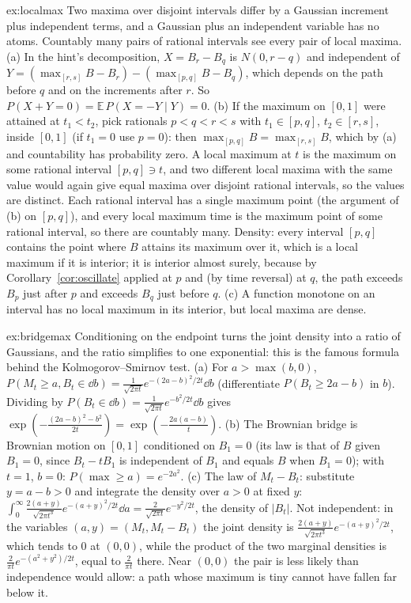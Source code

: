 \begin{solution}{ex:localmax}
\idea Two maxima over disjoint intervals differ by a Gaussian increment plus independent terms, and a Gaussian plus an independent variable has no atoms. Countably many pairs of rational intervals see every pair
of local maxima.
\writeup (a) In the hint's decomposition, $X=B_r-B_q$ is $N(0,r-q)$ and independent of $Y=(\max_{[r,s]}B-B_r)-(\max_{[p,q]}B-B_q)$, which depends on the path before $q$ and on the increments after $r$. So
$P(X+Y=0)=\mathbb E\,P(X=-Y\mid Y)=0$. (b) If the maximum on $[0,1]$ were attained at $t_1<t_2$, pick rationals $p<q<r<s$ with $t_1\in[p,q]$, $t_2\in[r,s]$, inside $[0,1]$ (if $t_1=0$ use $p=0$): then
$\max_{[p,q]}B=\max_{[r,s]}B$, which by (a) and countability has probability zero. A local maximum at $t$ is the maximum on some rational interval $[p,q]\ni t$, and two different local maxima with the same value would
again give equal maxima over disjoint rational intervals, so the values are distinct. Each rational interval has a single maximum point (the argument of (b) on $[p,q]$), and every local maximum time is the maximum
point of some rational interval, so there are countably many. Density: every interval $[p,q]$ contains the point where $B$ attains its maximum over it, which is a local maximum if it is interior; it is interior
almost surely, because by Corollary~\ref{cor:oscillate} applied at $p$ and (by time reversal) at $q$, the path exceeds $B_p$ just after $p$ and exceeds $B_q$ just before $q$. (c) A function monotone on an interval has no local
maximum in its interior, but local maxima are dense.
\end{solution}

\begin{solution}{ex:bridgemax}
\idea Conditioning on the endpoint turns the joint density into a ratio of Gaussians, and the ratio simplifies to one exponential: this is the famous formula behind the Kolmogorov--Smirnov test.
\writeup (a) For $a>\max(b,0)$, $P(M_t\ge a,B_t\in\dd b)=\frac{1}{\sqrt{2\pi t}}e^{-(2a-b)^2/2t}\dd b$ (differentiate $P(B_t\ge2a-b)$ in $b$). Dividing by $P(B_t\in\dd b)=\frac1{\sqrt{2\pi t}}e^{-b^2/2t}\dd b$ gives
$\exp(-\frac{(2a-b)^2-b^2}{2t})=\exp(-\frac{2a(a-b)}t)$. (b) The Brownian bridge is Brownian motion on $[0,1]$ conditioned on $B_1=0$ (its law is that of $B$ given $B_1=0$, since $B_t-tB_1$ is independent of $B_1$ and equals $B$ when $B_1=0$); with $t=1$, $b=0$: $P(\max\ge a)=e^{-2a^2}$. (c) The law of $M_t-B_t$: substitute $y=a-b>0$ and integrate the density over $a>0$ at fixed $y$: $\int_0^\infty\frac{2(a+y)}{\sqrt{2\pi t^3}}e^{-(a+y)^2/2t}\dd a=\frac2{\sqrt{2\pi t}}e^{-y^2/2t}$, the density of $|B_t|$. Not independent: in the variables $(a,y)=(M_t,M_t-B_t)$ the joint density is $\frac{2(a+y)}{\sqrt{2\pi t^3}}e^{-(a+y)^2/2t}$, which tends to $0$ at $(0,0)$, while the product of the two marginal densities is
$\frac2{\pi t}e^{-(a^2+y^2)/2t}$, equal to $\frac2{\pi t}$ there. Near $(0,0)$ the pair is less likely than independence would allow: a path whose maximum is tiny cannot have fallen far below it.
\end{solution}

